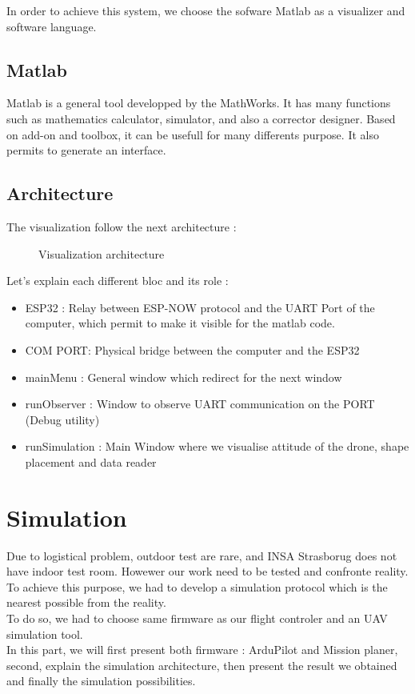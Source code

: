 In order to achieve this system, we choose the sofware Matlab as a visualizer and software language.  

\subsection{Matlab}

Matlab is a general tool developped by the MathWorks. It has many functions such as mathematics calculator, simulator, and also a corrector designer. Based on add-on and toolbox, it can be usefull for many differents purpose. It also permits to generate an interface. 

\subsection{Architecture}

The visualization follow the next architecture : 
\begin{figure}[H]
  \centering
   \resizebox{0.9\textwidth}{!}{\SchVisualisation}
  \caption{Visualization architecture}
\end{figure}

Let's explain each different bloc and its role : 

\begin{itemize}
    \item ESP32 : Relay between ESP-NOW protocol and the UART Port of the computer, which permit to make it visible for the matlab code.
    \item COM PORT: Physical bridge between the computer and the ESP32
    \item mainMenu : General window which redirect for the next window
    \item runObserver : Window to observe UART communication on the PORT (Debug utility)
    \item runSimulation : Main Window where we visualise attitude of the drone, shape placement and data reader
\end{itemize}

\newpage
\section{Simulation}
\label{Simulation}

Due to logistical problem, outdoor test are rare, and INSA Strasborug does not have indoor test room. Howewer our work need to be tested and confronte reality. To achieve this purpose, we had to develop a simulation protocol which is the nearest possible from the reality. \\
To do so, we had to choose same firmware as our flight controler and an UAV simulation tool. \\
In this part, we will first present both firmware : ArduPilot and Mission planer, second, explain the simulation architecture, then present the result we obtained and finally the simulation possibilities.

